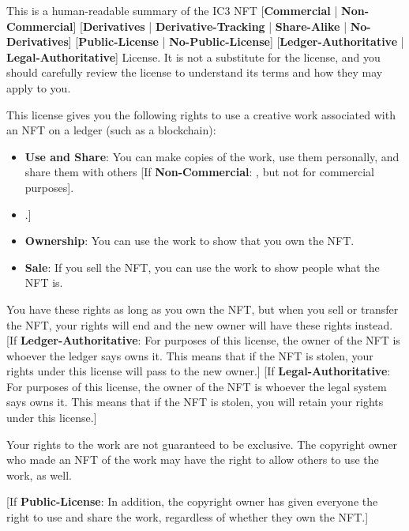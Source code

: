 \documentclass{article}
\newcommand{\keyword}[1]{\textbf{#1}\xspace}
\newcommand{\publiclicense}{\keyword{Public-License}}
\newcommand{\nopubliclicense}{\keyword{No-Public-License}}
\newcommand{\commercial}{\keyword{Commercial}}
\newcommand{\noncommercial}{\keyword{Non-Commercial}}
\newcommand{\derivative}{\keyword{Derivatives}}
\newcommand{\sharealike}{\keyword{Share-Alike}}
\newcommand{\derivativetracking}{\keyword{Derivative-Tracking}}
\newcommand{\noderivative}{\keyword{No-Derivatives}}
\newcommand{\ledger}{\keyword{Ledger-Authoritative}}
\newcommand{\legal}{\keyword{Legal-Authoritative}}
\newcommand{\iflicenseoption}[2]{[\colorbox{light-gray}{If #1:} #2]}
\newcommand{\ifnotlicenseoption}[2]{[\colorbox{light-gray}{Unless #1:} #2]}
\begin{document}
This is a human-readable summary of the IC3 NFT [\commercial{} | \noncommercial{}] [\derivative{} | \derivativetracking{} | \sharealike{} | \noderivative{}]  [\publiclicense{} | \nopubliclicense{}] [\ledger{} | \legal{}] License. It is not a substitute for the license, and you should carefully review the license to understand its terms and how they may apply to you.

This license gives you the following rights to use a creative work associated with an NFT on a ledger (such as a blockchain): 

\begin{itemize}
\item \textbf{Use and Share}: You can make copies of the work, use them personally, and share them with others \iflicenseoption{\noncommercial}{, but not for commercial purposes}.
\item \ifnotlicenseoption{\noderivative}{\textbf{Derivatives}: you can make new works that include and build on the work, use them, and share them with others \iflicenseoption{\noncommercial}{, but not for commercial purposes} \iflicenseoption{\derivativetracking}{, provided that you also release them as NFTs} \iflicenseoption{\sharealike}{, provided that you also release them as NFTs under the same license}.}
\item \textbf{Ownership}: You can use the work to show that you own the NFT.
\item \textbf{Sale}: If you sell the NFT, you can use the work to show people what the NFT is.
\end{itemize}

You have these rights as long as you own the NFT, but when you sell or transfer the NFT, your rights will end and the new owner will have these rights instead. \iflicenseoption{\ledger}{For purposes of this license, the owner of the NFT is whoever the ledger says owns it. This means that if the NFT is stolen, your rights under this license will pass to the new owner.} \iflicenseoption{\legal}{For purposes of this license, the owner of the NFT is whoever the legal system says owns it. This means that if the NFT is stolen, you will retain your rights under this license.}

Your rights to the work are not guaranteed to be exclusive. The copyright owner who made an NFT of the work may have the right to allow others to use the work, as well. 

\iflicenseoption{\publiclicense}{In addition, the copyright owner has given everyone the right to use and share the work, regardless of whether they own the NFT.}
\end{document}
